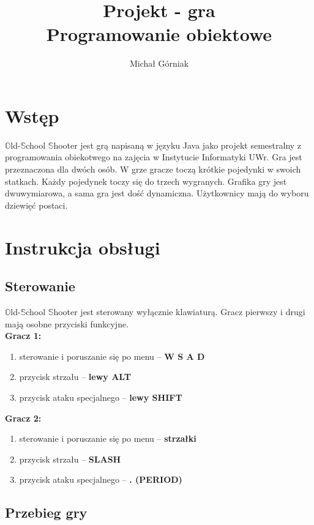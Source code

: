 \documentclass[a4paper,10pt]{article}
\title{
	Projekt - gra \name \\
	\large Programowanie obiektowe}
\author{Michał Górniak}
\newcommand{\name}{\( \mathbb{O} \)ld-\( \mathbb{S} \)chool \( \mathbb{S} \)hooter }
\begin{document}
\maketitle

\section{Wstęp}

\name jest grą napisaną w języku Java jako projekt semestralny z programowania obiekotwego na zajęcia w Instytucie Informatyki UWr. Gra jest przeznaczona dla dwóch osób. W grze gracze toczą krótkie pojedynki w swoich statkach. Każdy pojedynek toczy się do trzech wygranych. Grafika gry jest dwuwymiarowa, a sama gra jest dość dynamiczna. Użytkownicy mają do wyboru dziewięć postaci.

\section{Instrukcja obsługi}

\subsection{Sterowanie}

\name jest sterowany wyłącznie klawiaturą. Gracz pierwszy i drugi mają osobne przyciski funkcyjne. \\

\textbf{Gracz 1:}
\begin{enumerate}
\item
sterowanie i poruszanie się po menu -- \textbf{W S A D}
\item
przycisk strzału -- \textbf{lewy ALT}
\item
przycisk ataku specjalnego -- \textbf{lewy SHIFT}
\end{enumerate}

\textbf{Gracz 2:}
\begin{enumerate}
\item
sterowanie i poruszanie się po menu -- \textbf{strzałki}
\item
przycisk strzału -- \textbf{SLASH}
\item
przycisk ataku specjalnego -- \textbf{. (PERIOD)}
\end{enumerate}

\subsection{Przebieg gry}
\end{document}
